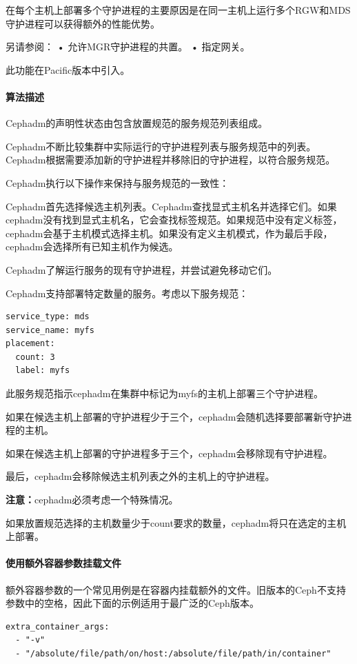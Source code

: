 \documentclass[12pt,UTF8]{ctexbook}
\begin{document}
在每个主机上部署多个守护进程的主要原因是在同一主机上运行多个RGW和MDS守护进程可以获得额外的性能优势。

另请参阅：
• 允许MGR守护进程的共置。
• 指定网关。

此功能在Pacific版本中引入。

\paragraph{算法描述}

Cephadm的声明性状态由包含放置规范的服务规范列表组成。

Cephadm不断比较集群中实际运行的守护进程列表与服务规范中的列表。Cephadm根据需要添加新的守护进程并移除旧的守护进程，以符合服务规范。

Cephadm执行以下操作来保持与服务规范的一致性：

Cephadm首先选择候选主机列表。Cephadm查找显式主机名并选择它们。如果cephadm没有找到显式主机名，它会查找标签规范。如果规范中没有定义标签，cephadm会基于主机模式选择主机。如果没有定义主机模式，作为最后手段，cephadm会选择所有已知主机作为候选。

Cephadm了解运行服务的现有守护进程，并尝试避免移动它们。

Cephadm支持部署特定数量的服务。考虑以下服务规范：
\begin{verbatim}
service_type: mds
service_name: myfs
placement:
  count: 3
  label: myfs
\end{verbatim}

此服务规范指示cephadm在集群中标记为myfs的主机上部署三个守护进程。

如果在候选主机上部署的守护进程少于三个，cephadm会随机选择要部署新守护进程的主机。

如果在候选主机上部署的守护进程多于三个，cephadm会移除现有守护进程。

最后，cephadm会移除候选主机列表之外的主机上的守护进程。

\textbf{注意：}cephadm必须考虑一个特殊情况。

如果放置规范选择的主机数量少于count要求的数量，cephadm将只在选定的主机上部署。

\paragraph{使用额外容器参数挂载文件}

额外容器参数的一个常见用例是在容器内挂载额外的文件。旧版本的Ceph不支持参数中的空格，因此下面的示例适用于最广泛的Ceph版本。

\begin{verbatim}
extra_container_args:
  - "-v"
  - "/absolute/file/path/on/host:/absolute/file/path/in/container"
\end{verbatim}
\end{document}
